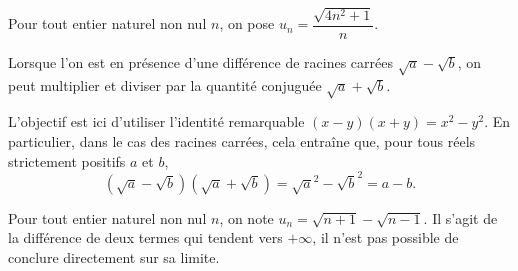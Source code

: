 \documentclass[11pt,fleqn]{book} %
\begin{document}
\begin{example}Pour tout entier naturel non nul $n$, on pose $u_n = \dfrac{\sqrt{4n^2+1}}{n}$.

\vskip150pt

\end{example}

Lorsque l'on est en présence d'une différence de racines carrées $\sqrt{a}-\sqrt{b}$, on peut multiplier et diviser par la quantité conjuguée $\sqrt{a}+\sqrt{b}$.

L'objectif est ici d'utiliser l'identité remarquable $(x-y)(x+y)=x^2-y^2$. En particulier, dans le cas des racines carrées, cela entraîne que, pour tous réels strictement positifs $a$ et $b$,\[(\sqrt{a}-\sqrt{b})(\sqrt{a}+\sqrt{b})=\sqrt{a}^2-\sqrt{b}^2=a-b.\]

\begin{example} Pour tout entier naturel non nul $n$, on note $u_n=\sqrt{n+1}-\sqrt{n-1}$. Il s'agit de la différence de deux termes qui tendent vers $+\infty$, il n'est pas possible de conclure directement sur sa limite. 
\vskip80pt
\end{example}

\newpage
\end{document}
